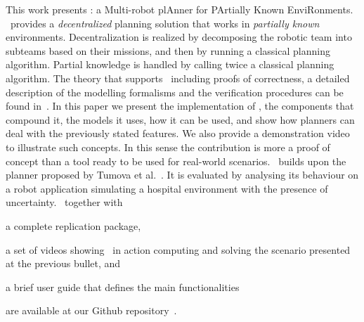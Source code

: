 


This work presents  \toolName: a Multi-robot plAnner for PArtially Known EnviRonments.
 \toolName\ provides a  \emph{decentralized} planning solution that works in \emph{partially known} environments.
Decentralization is realized by decomposing the robotic team into subteams based on their missions, and then by running a classical planning algorithm.
Partial knowledge is handled by calling twice a classical planning algorithm.
The theory that supports \toolName\ including proofs of correctness, a detailed description of the modelling formalisms and the verification procedures can be found in~\cite{menghi2018multi}.
In this paper we present the implementation of \toolName, the components that compound it, the models it uses, how it can be used, and  show how planners can deal with the previously stated features. 
We also provide a demonstration video to illustrate such concepts.
In this sense the contribution is more a proof of concept than a tool ready to be used for real-world scenarios.
\toolName~builds upon the planner proposed by Tumova et al.~\cite{tumova2016multi}.
It is evaluated by analysing its behaviour on a robot application simulating a hospital environment with the presence of uncertainty.
\toolName\  together with 
\begin{enumerate*}
\item a complete replication package,
\item a set of videos showing \toolName\ in action computing and solving the scenario presented at the previous bullet, and
\item a brief user guide that defines the main functionalities 
\end{enumerate*}
 are available at our Github repository~\cite{repo}. %



